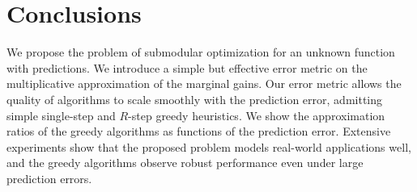 \section{Conclusions} \label{sec:conclusions}

We propose the problem of submodular optimization for an unknown function with predictions. We introduce a simple but effective error metric on the multiplicative approximation of the marginal gains. Our error metric allows the quality of algorithms to scale smoothly with the prediction error, admitting simple single-step and $R$-step greedy heuristics. We show the approximation ratios of the greedy algorithms as functions of the prediction error. Extensive experiments show that the proposed problem models real-world applications well, and the greedy algorithms observe robust performance even under large prediction errors. 
